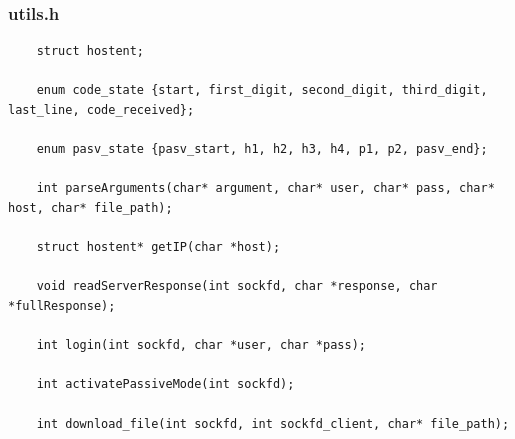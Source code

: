 \documentclass[article, a4paper, 11pt, oneside]{memoir}
\begin{document}
\subsubsection{utils.h}
\begin{lstlisting}
	struct hostent;

	enum code_state {start, first_digit, second_digit, third_digit, last_line, code_received};
	
	enum pasv_state {pasv_start, h1, h2, h3, h4, p1, p2, pasv_end};
	
	int parseArguments(char* argument, char* user, char* pass, char* host, char* file_path);
	
	struct hostent* getIP(char *host);
	
	void readServerResponse(int sockfd, char *response, char *fullResponse);
	
	int login(int sockfd, char *user, char *pass);
	
	int activatePassiveMode(int sockfd);
	
	int download_file(int sockfd, int sockfd_client, char* file_path);
\end{lstlisting}
\end{document}
